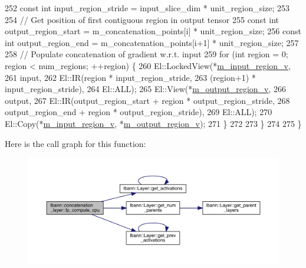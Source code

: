\begin{DoxyCode}
252       \textcolor{keyword}{const} \textcolor{keywordtype}{int} input\_region\_stride = input\_slice\_dim * unit\_region\_size;
253 
254       \textcolor{comment}{// Get position of first contiguous region in output tensor}
255       \textcolor{keyword}{const} \textcolor{keywordtype}{int} output\_region\_start = m\_concatenation\_points[i] * unit\_region\_size;
256       \textcolor{keyword}{const} \textcolor{keywordtype}{int} output\_region\_end = m\_concatenation\_points[i+1] * unit\_region\_size;
257 
258       \textcolor{comment}{// Populate concatenation of gradient w.r.t. input}
259       \textcolor{keywordflow}{for} (\textcolor{keywordtype}{int} region = 0; region < num\_regions; ++region) \{
260         El::LockedView(*\hyperlink{classlbann_1_1concatenation__layer_afa68f2e5d3ea2de57f4974a37c01fc7b}{m\_input\_region\_v},
261                        input,
262                        El::IR(region * input\_region\_stride,
263                               (region+1) * input\_region\_stride),
264                        El::ALL);
265         El::View(*\hyperlink{classlbann_1_1concatenation__layer_af141bf9cf1569121a65a68e4ae97855c}{m\_output\_region\_v},
266                  output,
267                  El::IR(output\_region\_start + region * output\_region\_stride,
268                         output\_region\_end + region * output\_region\_stride),
269                  El::ALL);
270         El::Copy(*\hyperlink{classlbann_1_1concatenation__layer_afa68f2e5d3ea2de57f4974a37c01fc7b}{m\_input\_region\_v}, *\hyperlink{classlbann_1_1concatenation__layer_af141bf9cf1569121a65a68e4ae97855c}{m\_output\_region\_v});
271       \}
272 
273     \}
274 
275   \}
\end{DoxyCode}
Here is the call graph for this function\+:\nopagebreak
\begin{figure}[H]
\begin{center}
\leavevmode
\includegraphics[width=350pt]{classlbann_1_1concatenation__layer_a53b3f53828d4982452dd6e79b8ebce50_cgraph}
\end{center}
\end{figure}
